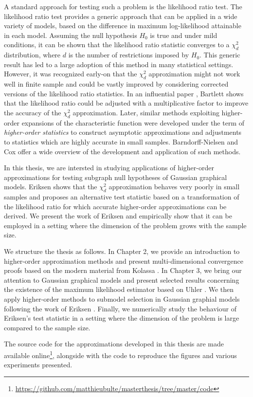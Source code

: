 A standard approach for testing such a problem is the likelihood ratio test. The likelihood ratio test provides a generic approach that can be applied in a wide variety of models, based on the difference in maximum log-likelihood attainable in each model. Assuming the null hypothesis $H_0$ is true and under mild conditions, it can be shown that the likelihood ratio statistic converges to a $\chi^2_d$ distribution, where $d$ is the number of restrictions imposed by $H_0$. This generic result has led to a large adoption of this method in many statistical settings. However, it was recognized early-on that the $\chi^2_d$ approximation might not work well in finite sample and could be vastly improved by considering corrected versions of the likelihood ratio statistics. In an influential paper \cite{bartlett1937properties}, Bartlett shows that the likelihood ratio could be adjusted with a multiplicative factor to improve the accuracy of the $\chi^2_d$ approximation. Later, similar methods exploiting higher-order expansions of the characteristic function were developed under the term of \textit{higher-order statistics} to construct asymptotic approximations and adjustments to statistics which are highly accurate in small samples. Barndorff-Nielsen and Cox \cite{barndorff1989asymptotic, cox1994inference} offer a wide overview of the development and application of such methods.

In this thesis, we are intersted in studying applications of higher-order approximations for testing subgraph null hypotheses of Gaussian graphical models. Eriksen \cite{eriksen1996tests} shows that the $\chi^2_d$ approximation behaves very poorly in small samples and proposes an alternative test statistic based on a transformation of the likelihood ratio for which accurate higher-order approximations can be derived. We present the work of Eriksen and empirically show that it can be employed in a setting where the dimension of the problem grows with the sample size.

We structure the thesis as follows. In Chapter 2, we provide an introduction to higher-order approximation methods and present multi-dimensional convergence proofs based on the modern material from Kolassa \cite{kolassa2006series}. In Chapter 3, we bring our attention to Gaussian graphical models and present selected results concerning the existence of the maximum likelihood estimator based on Uhler \cite[Chapter 9]{maathuis2018handbook}. We then apply higher-order methods to submodel selection in Gaussian graphial models following the work of Eriksen \cite{eriksen1996tests}. Finally, we numerically study the behaviour of Eriksen's test statistic in a setting where the dimension of the problem is large compared to the sample size.

The source code for the approximations developed in this thesis are made available online\footnote{\url{https://github.com/matthieubulte/masterthesis/tree/master/code}}, alongside with the code to reproduce the figures and various experiments presented.